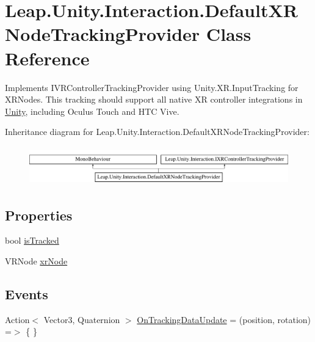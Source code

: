 \hypertarget{class_leap_1_1_unity_1_1_interaction_1_1_default_x_r_node_tracking_provider}{}\section{Leap.\+Unity.\+Interaction.\+Default\+X\+R\+Node\+Tracking\+Provider Class Reference}
\label{class_leap_1_1_unity_1_1_interaction_1_1_default_x_r_node_tracking_provider}


Implements I\+V\+R\+Controller\+Tracking\+Provider using Unity.\+X\+R.\+Input\+Tracking for X\+R\+Nodes. This tracking should support all native XR controller integrations in \mbox{\hyperlink{namespace_leap_1_1_unity}{Unity}}, including Oculus Touch and H\+TC Vive.  


Inheritance diagram for Leap.\+Unity.\+Interaction.\+Default\+X\+R\+Node\+Tracking\+Provider\+:\begin{figure}[H]
\begin{center}
\leavevmode
\includegraphics[height=1.686747cm]{class_leap_1_1_unity_1_1_interaction_1_1_default_x_r_node_tracking_provider}
\end{center}
\end{figure}
\subsection*{Properties}
\begin{DoxyCompactItemize}
\item 
bool \mbox{\hyperlink{class_leap_1_1_unity_1_1_interaction_1_1_default_x_r_node_tracking_provider_a3c3f8c88548157a2fd99a8beebb8cc4a}{is\+Tracked}}
\item 
V\+R\+Node \mbox{\hyperlink{class_leap_1_1_unity_1_1_interaction_1_1_default_x_r_node_tracking_provider_a835fe349110d1736872b1df83d0f70bd}{xr\+Node}}
\end{DoxyCompactItemize}
\subsection*{Events}
\begin{DoxyCompactItemize}
\item 
Action$<$ Vector3, Quaternion $>$ \mbox{\hyperlink{class_leap_1_1_unity_1_1_interaction_1_1_default_x_r_node_tracking_provider_a46cfa24510d32bd6db4f29b676ab7490}{On\+Tracking\+Data\+Update}} = (position, rotation) =$>$ \{ \}
\end{DoxyCompactItemize}


